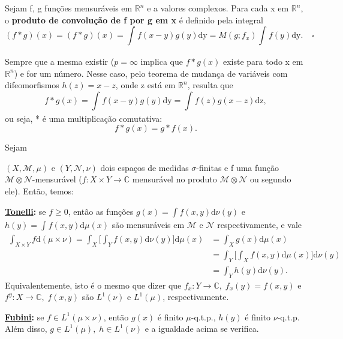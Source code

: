 \documentclass[../distribution_theory_notes.tex]{subfiles}
\begin{document}
\begin{def*}
	Sejam f, g funções mensuráveis em \(\mathbb{R}^{n}\) e a valores complexos. Para cada x em \(\mathbb{R}^{n}\), o \textbf{produto de convolução de f por g em x} é definido pela integral
	\[
		(f*g)(x)=(f*g)(x) = \int_{}^{}f(x-y)g(y) \mathrm{dy} = M(g; f_x)\int_{}^{}f(y) \mathrm{dy}. \quad \square
	\]
\end{def*}
Sempre que a mesma existir (\(p=\infty\) implica que \(f*g(x)\) existe para todo x em \(\mathbb{R}^{n}\)) e for um número. Nesse caso, pelo teorema de mudança de variáveis com difeomorfismos \(h(z)=x-z\), onde z está em \(\mathbb{R}^{n}\), resulta que
\[
	f*g(x)=\int_{}^{}f(x-y)g(y) \mathrm{dy} = \int_{}^{}f(z)g(x-z) \mathrm{dz},
\]
ou seja, * é uma multiplicação comutativa:
\[
	f*g(x)=g*f(x).
\]
\begin{tcolorbox}[
		skin=enhanced,
		title=Lembrete!,
		after title={\hfill Fubini-Tonelli},
		fonttitle=\bfseries,
		sharp corners=downhill,
		colframe=black,
		colbacktitle=yellow!75!white,
		colback=yellow!30,
		colbacklower=black,
		coltitle=black,
		drop large lifted shadow
	]
	\begin{theorem*}
		\hypertarget{fubini_tonelli}{Sejam}\((X, \mathcal{M}, \mu )\) e \((Y, \mathcal{N}, \nu)\) dois espaços de medidas \(\sigma \)-finitas e f uma função \( \mathcal{M} \otimes \mathcal{N}\)-mensurável (\(f:X\times Y\rightarrow \mathbb{C}\) mensurável no produto \(\mathcal{M}\otimes \mathcal{N}\) ou segundo ele). Então, temos:

		\textbf{\underline{Tonelli}:} se \(f\geq 0\), então as funções \(g(x)=\int_{}^{}f(x, y) \mathrm{d}\nu(y)\) e \(h(y)=\int_{}^{}f(x, y) \mathrm{d}\mu(x)\) são mensuráveis em \(\mathcal{M}\) e \(\mathcal{N}\) respectivamente, e vale
		\begin{align*}
			\int_{X\times Y}^{}f \mathrm{d}(\mu \times \nu ) = \int_{X}^{}\biggl[\int_{Y}^{}f(x, y) \mathrm{d}\nu (y)\biggr] \mathrm{d}\mu(x) & = \int_{X}^{}g(x) \mathrm{d}\mu (x)                                              \\
			                                                                                                                                  & = \int_{Y}^{}\biggl[\int_{X}^{}f(x, y) \mathrm{d}\mu (x)\biggr] \mathrm{d}\nu(y) \\
			                                                                                                                                  & = \int_{Y}^{}h(y) \mathrm{d}\nu (y).
		\end{align*}
		Equivalentemente, isto é o mesmo que dizer que \(f_x:Y\rightarrow \mathbb{C},\; f_x(y)=f(x, y)\) e \(f^{y}:X\rightarrow \mathbb{C},\; f(x, y)\) são \(L^{1}(\nu )\) e \(L^{1}(\mu )\), respectivamente.

		\textbf{\underline{Fubini}:} se \(f\in L^{1}(\mu \times \nu )\), então \(g(x)\) é finito \(\mu\)-q.t.p., \(h(y)\) é finito \(\nu\)-q.t.p. Além disso, \(g\in L^{1}(\mu ),\; h\in L^{1}(\nu )\) e a igualdade acima se verifica.
	\end{theorem*}
\end{tcolorbox}
\end{document}
